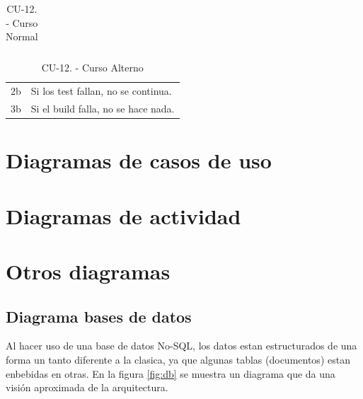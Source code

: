 \begin{itemize}
\begin{table}[H]
\begin{tabularx}{\textwidth}{|l|X|l|X|}
                                
    \end{tabularx}
    \caption{CU-12. - Curso Normal}
    \label{my-label}
  \end{table}
  \begin{table}[H]
    \centering
    \begin{tabularx}{\textwidth}{|l|X|}
     \hline
     \rowcolor[HTML]{C0C0C0} 
     \multicolumn{2}{|l|}{\cellcolor[HTML]{C0C0C0}Curso Alterno} \\ \hline
     \rowcolor[HTML]{FFFFFF} 
            2b                      & Si los test fallan, no se continua.                           \\ \hline
            3b                      & Si el build falla, no se hace nada.                           \\ \hline
    \end{tabularx}
    \caption{CU-12. - Curso Alterno}
    \label{my-label}
  \end{table}
\end{itemize}


\section {Diagramas de casos de uso}
\section {Diagramas de actividad}
\section {Otros diagramas}
\subsection {Diagrama  bases de datos}
Al hacer uso de una base de datos No-SQL, los datos estan estructurados de una forma un tanto diferente a la clasica, ya que algunas tablas (documentos) estan enbebidas en otras. En la figura \ref{fig:db} se muestra un diagrama que da una visión aproximada de la arquitectura.

